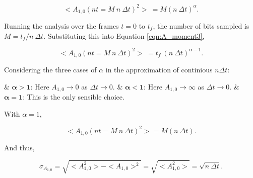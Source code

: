 \begin{description}
					\begin{equation}
						<A_{1,0}(nt = M\ n\ \Delta t)^2>\ = M (n\ \Delta t)^\alpha.
						\label{eqn:A_moment3}
					\end{equation}

					Running the analysis over the frames $t = 0$ to $t_f$, the number of bits sampled is $M = {t_f / n\ \Delta t}$. Substituting this into Equation \ref{eqn:A_moment3},

					\begin{equation}
						<A_{1,0}(nt = M\ n\ \Delta t)^2>\ = t_f\ (n\ \Delta t)^{\alpha -1}.
					\end{equation}

					Considering the three cases of $\alpha$ in the approximation of continious $n \Delta t$:
					
					\vspace{1em}

					\begin{easylist}[itemize]
						& $\bm{\alpha > 1}$: Here $A_{1,0} \to 0$ as $\Delta t \to 0$.
						& $\bm{\alpha < 1}$: Here $A_{1,0} \to \infty$ as $\Delta t \to 0$.
						& $\bm{\alpha = 1}$: This is the only sensible choice.
					\end{easylist}
					
					\vspace{1em}

					With $\alpha =1$,

					\begin{equation}
						<A_{1,0}(nt = M\ n\ \Delta t)^2> = M (n\ \Delta t).
					\end{equation}

					And thus,

					\begin{equation}
						\sigma_{A_{1,0}} = \sqrt{<A_{1,0}^2> - <A_{1,0}>^2} = \sqrt{<A_{1,0}^2>} = \sqrt{n\ \Delta t}.
					\end{equation}

			\end{description}	


